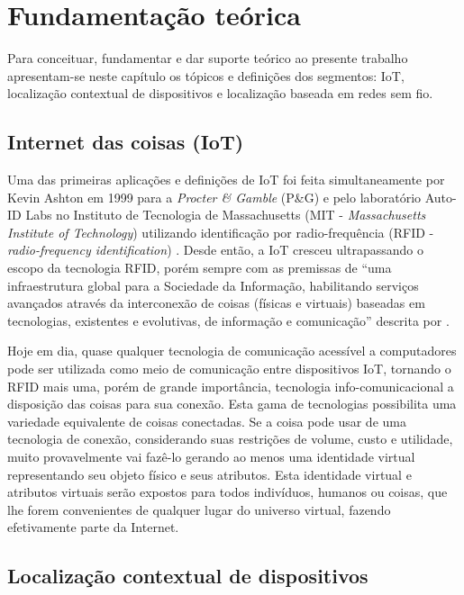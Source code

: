 \chapter{Fundamentação teórica}
\label{chap:Fundamentação teorica}


Para conceituar, fundamentar e dar suporte teórico ao presente trabalho
apresentam-se neste capítulo os tópicos e definições dos segmentos: IoT,
localização contextual de dispositivos e localização baseada em redes sem fio.

\section{Internet das coisas (IoT)}
\label{sec:INTERNET DAS COISAS (IOT)}

Uma das primeiras aplicações e definições de IoT foi feita simultaneamente por
Kevin Ashton em 1999 para a \emph{Procter \& Gamble} (P\&G) \cite{Ashton2009} e
pelo laboratório Auto-ID Labs no Instituto de Tecnologia de Massachusetts (MIT -
\emph{Massachusetts Institute of Technology}) utilizando identificação por
radio-frequência (RFID - \emph{radio-frequency identification})
\cite{ATZORI2010, Friedemann2011}. Desde então, a IoT cresceu ultrapassando o
escopo da tecnologia RFID, porém sempre com as premissas de ``uma infraestrutura
global para a Sociedade da Informação, habilitando serviços avançados através da
interconexão de coisas (físicas e virtuais) baseadas em tecnologias, existentes
e evolutivas, de informação e comunicação'' descrita por .

Hoje em dia, quase qualquer tecnologia de comunicação acessível a computadores
pode ser utilizada como meio de comunicação entre dispositivos IoT, tornando
o RFID mais uma, porém de grande importância, tecnologia info-comunicacional a
disposição das coisas para sua conexão. Esta gama de tecnologias possibilita uma
variedade equivalente de coisas conectadas. Se a coisa pode usar de uma
tecnologia de conexão, considerando suas restrições de volume, custo e
utilidade, muito provavelmente vai fazê-lo gerando ao menos uma identidade
virtual representando seu objeto físico e seus atributos. Esta identidade
virtual e atributos virtuais serão expostos para todos indivíduos, humanos ou
coisas, que lhe forem convenientes de qualquer lugar do universo virtual,
fazendo efetivamente parte da Internet.

\section{Localização contextual de dispositivos}
\label{sec:Localização contextual de dispositivos}

